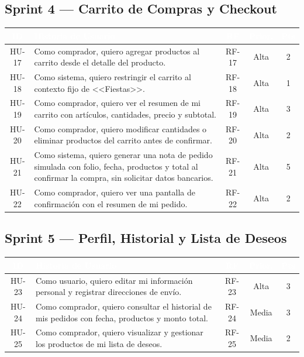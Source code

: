 \documentclass[12pt,a4paper]{article}
\begin{document}
\subsection{Sprint 4 --- Carrito de Compras y Checkout}
\begin{longtable}{|c|p{8cm}|c|c|c|}
\hline
\rowcolor{darkbg}\textcolor{white}{\textbf{ID}} & \textcolor{white}{\textbf{Historia de Usuario}} & \textcolor{white}{\textbf{RF}} & \textcolor{white}{\textbf{Prior.}} & \textcolor{white}{\textbf{Pts}} \\
\hline
HU-17 & Como comprador, quiero agregar productos al carrito desde el detalle del producto. & RF-17 & Alta & 2 \\
\hline
HU-18 & Como sistema, quiero restringir el carrito al contexto fijo de <<Fiestas>>. & RF-18 & Alta & 1 \\
\hline
HU-19 & Como comprador, quiero ver el resumen de mi carrito con artículos, cantidades, precio y subtotal. & RF-19 & Alta & 3 \\
\hline
HU-20 & Como comprador, quiero modificar cantidades o eliminar productos del carrito antes de confirmar. & RF-20 & Alta & 2 \\
\hline
HU-21 & Como sistema, quiero generar una nota de pedido simulada con folio, fecha, productos y total al confirmar la compra, sin solicitar datos bancarios. & RF-21 & Alta & 5 \\
\hline
HU-22 & Como comprador, quiero ver una pantalla de confirmación con el resumen de mi pedido. & RF-22 & Alta & 2 \\
\hline
\end{longtable}

\subsection{Sprint 5 --- Perfil, Historial y Lista de Deseos}
\begin{longtable}{|c|p{8cm}|c|c|c|}
\hline
\rowcolor{darkbg}\textcolor{white}{\textbf{ID}} & \textcolor{white}{\textbf{Historia de Usuario}} & \textcolor{white}{\textbf{RF}} & \textcolor{white}{\textbf{Prior.}} & \textcolor{white}{\textbf{Pts}} \\
\hline
HU-23 & Como usuario, quiero editar mi información personal y registrar direcciones de envío. & RF-23 & Alta & 3 \\
\hline
HU-24 & Como comprador, quiero consultar el historial de mis pedidos con fecha, productos y monto total. & RF-24 & Media & 3 \\
\hline
HU-25 & Como comprador, quiero visualizar y gestionar los productos de mi lista de deseos. & RF-25 & Media & 2 \\
\hline
\end{longtable}
\end{document}
